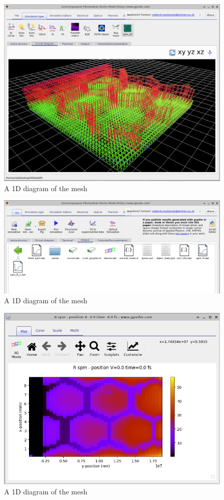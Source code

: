 \begin{figure}[H]
\centering
\includegraphics[width=\textwidth]{./images/la_2.png}
\caption{A 1D diagram of the mesh}
\label{fig:emeshdiagram}
\end{figure}

\begin{figure}[H]
\centering
\includegraphics[width=\textwidth]{./images/la_3.png}
\caption{A 1D diagram of the mesh}
\label{fig:emeshdiagram}
\end{figure}

\begin{figure}[H]
\centering
\includegraphics[width=\textwidth]{./images/la_4.png}
\caption{A 1D diagram of the mesh}
\label{fig:emeshdiagram}
\end{figure}

